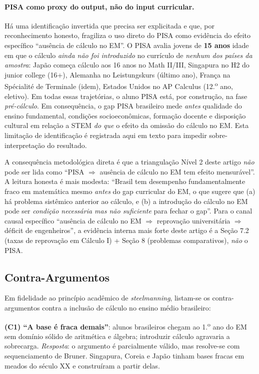 \documentclass[12pt,a4paper,oneside]{article}
\begin{document}
\paragraph{PISA como proxy do output, não do input curricular.}
Há uma identificação invertida que precisa ser explicitada e que,
por reconhecimento honesto, fragiliza o uso direto do PISA como
evidência do efeito específico ``ausência de cálculo no EM''. O
PISA avalia jovens de \textbf{15 anos} \textemdash{} idade em que o
cálculo \emph{ainda não foi introduzido} no currículo de
\emph{nenhum dos países da amostra}: Japão começa cálculo aos 16
anos no Math II/III, Singapura no H2 do junior college (16+),
Alemanha no Leistungskurs (último ano), França na Spécialité de
Terminale (idem), Estados Unidos no AP Calculus (12.\textsuperscript{o}
ano, eletivo). Em todas essas trajetórias, o aluno PISA está, por
construção, na fase \emph{pré-cálculo}. Em consequência, o gap PISA
brasileiro mede \emph{antes} qualidade do ensino fundamental,
condições socioeconômicas, formação docente e disposição cultural
em relação a STEM \emph{do que} o efeito da omissão do cálculo no
EM. Esta limitação de identificação é registrada aqui em texto para
impedir sobre-interpretação do resultado.

A consequência metodológica direta é que a triangulação Nível 2
deste artigo \emph{não} pode ser lida como ``PISA $\Rightarrow$ ausência
de cálculo no EM tem efeito mensurável''. A leitura honesta é mais
modesta: ``Brasil tem desempenho fundamentalmente fraco em
matemática mesmo \emph{antes} do gap curricular do EM, o que
sugere que (a) há problema sistêmico anterior ao cálculo, e (b) a
introdução do cálculo no EM pode ser \emph{condição necessária mas
não suficiente} para fechar o gap''. Para o canal causal específico
``ausência de cálculo no EM $\Rightarrow$ reprovação universitária
$\Rightarrow$ déficit de engenheiros'', a evidência interna mais
forte deste artigo é a Seção 7.2 (taxas de reprovação em Cálculo I) +
Seção 8 (problemas comparativos), \emph{não} o PISA.

\subsection{Contra-Argumentos}

Em fidelidade ao princípio acadêmico de \emph{steelmanning},
listam-se os contra-argumentos contra a inclusão de cálculo no
ensino médio brasileiro:

\textbf{(C1) ``A base é fraca demais''}: alunos brasileiros chegam
ao 1.\textsuperscript{o} ano do EM sem domínio sólido de aritmética
e álgebra; introduzir cálculo agravaria a sobrecarga.
\emph{Resposta}: o argumento é parcialmente válido, mas resolve-se
com sequenciamento de Bruner. Singapura, Coreia e Japão tinham
bases fracas em meados do século XX e construíram a partir delas.
\end{document}
